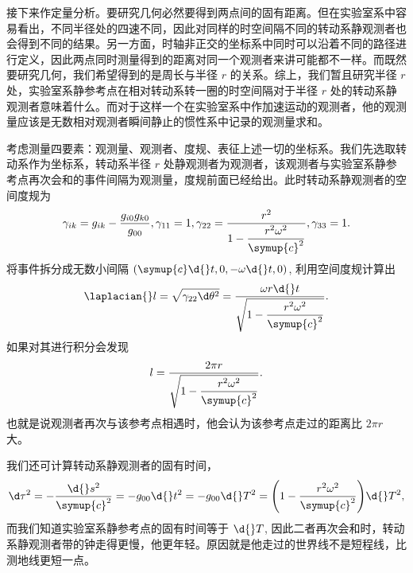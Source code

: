 \documentclass[UTF8, 12pt, a4paper, oneside, onecolumn, fontset=none]{ctexart}
\begin{document}
接下来作定量分析。要研究几何必然要得到两点间的固有距离。但在实验室系中容易看出，不同半径处的四速不同，因此对同样的时空间隔不同的转动系静观测者也会得到不同的结果。另一方面，时轴非正交的坐标系中同时可以沿着不同的路径进行定义，因此两点同时测量得到的距离对同一个观测者来讲可能都不一样。而既然要研究几何，我们希望得到的是周长与半径 $r$ 的关系。综上，我们暂且研究半径 $r$ 处，实验室系静参考点在相对转动系转一圈的时空间隔对于半径 $r$ 处的转动系静观测者意味着什么。而对于这样一个在实验室系中作加速运动的观测者，他的观测量应该是无数相对观测者瞬间静止的惯性系中记录的观测量求和。

考虑测量四要素：观测量、观测者、度规、表征上述一切的坐标系。我们先选取转动系作为坐标系，转动系半径 $r$ 处静观测者为观测者，该观测者与实验室系静参考点再次会和的事件间隔为观测量，度规前面已经给出。此时转动系静观测者的空间度规为
\begin{equation}
\gamma_{ik}=g_{ik}-\frac{g_{i0}g_{k0}}{g_{00}},\gamma_{11}=1,\gamma_{22}=\frac{r^{2}}{1-\dfrac{r^{2}\omega^{2}}{\symup{c}^{2}}},\gamma_{33}=1.
\end{equation}
将事件拆分成无数小间隔 $\mleft(\symup{c}\d{}t, 0,-\omega\d{}t, 0\mright)$, 利用空间度规计算出
\begin{equation}
\laplacian{}l=\sqrt{\gamma_{22}\d\theta^{2}}=\frac{\omega r\d{}t}{\sqrt{1-\dfrac{r^{2}\omega^{2}}{\symup{c}^{2}}}}.
\end{equation}
如果对其进行积分会发现
\begin{equation}
l=\frac{2\pi r}{\sqrt{1-\dfrac{r^{2}\omega^{2}}{\symup{c}^{2}}}}.
\end{equation}
也就是说观测者再次与该参考点相遇时，他会认为该参考点走过的距离比 $2\pi r$ 大。

我们还可计算转动系静观测者的固有时间，
\begin{equation}
\d\tau^{2}=-\frac{\d{}s^{2}}{\symup{c}^{2}}=-g_{00}\d{}t^{2}=-g_{00}\d{}T^{2}=\mleft(1-\frac{r^{2}\omega^{2}}{\symup{c}^{2}}\mright)\d{}T^{2},
\end{equation}
而我们知道实验室系静参考点的固有时间等于 $\d{}T$, 因此二者再次会和时，转动系静观测者带的钟走得更慢，他更年轻。原因就是他走过的世界线不是短程线，比测地线更短一点。
\end{document}
